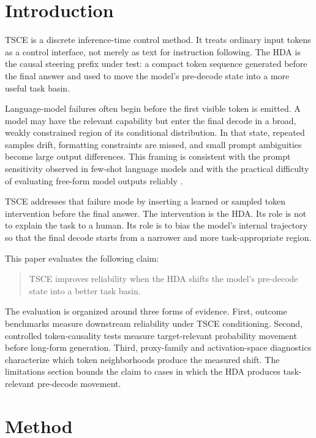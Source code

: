 \documentclass[11pt]{article}
\newcommand{\tsce}{\textsc{TSCE}}
\newcommand{\hda}{\textsc{HDA}}
\begin{document}
\section{Introduction}

\tsce{} is a discrete inference-time control method. It treats ordinary input tokens as a control interface, not merely as text for instruction following. The \hda{} is the causal steering prefix under test: a compact token sequence generated before the final answer and used to move the model's pre-decode state into a more useful task basin.

Language-model failures often begin before the first visible token is emitted. A model may have the relevant capability but enter the final decode in a broad, weakly constrained region of its conditional distribution. In that state, repeated samples drift, formatting constraints are missed, and small prompt ambiguities become large output differences. This framing is consistent with the prompt sensitivity observed in few-shot language models and with the practical difficulty of evaluating free-form model outputs reliably \cite{few-shot,fair-evaluators}.

\tsce{} addresses that failure mode by inserting a learned or sampled token intervention before the final answer. The intervention is the \hda{}. Its role is not to explain the task to a human. Its role is to bias the model's internal trajectory so that the final decode starts from a narrower and more task-appropriate region.

This paper evaluates the following claim:
\begin{quote}
\tsce{} improves reliability when the \hda{} shifts the model's pre-decode state into a better task basin.
\end{quote}

The evaluation is organized around three forms of evidence. First, outcome benchmarks measure downstream reliability under \tsce{} conditioning. Second, controlled token-causality tests measure target-relevant probability movement before long-form generation. Third, proxy-family and activation-space diagnostics characterize which token neighborhoods produce the measured shift. The limitations section bounds the claim to cases in which the \hda{} produces task-relevant pre-decode movement.

\section{Method}
\end{document}
